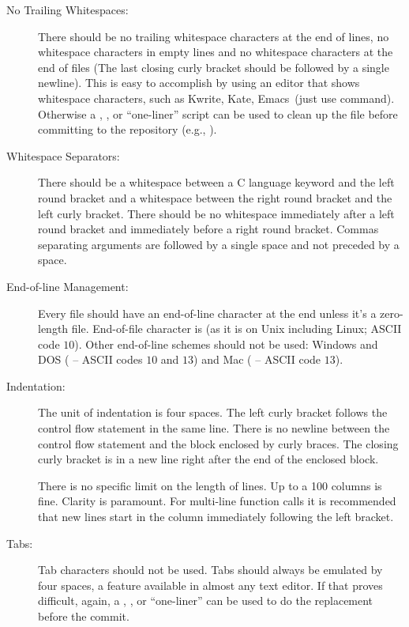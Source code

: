 \begin{description}
\item[No Trailing Whitespaces:]
There should be no trailing whitespace characters at the end of lines,
no whitespace characters in empty lines and no whitespace characters
at the end of files (The last closing curly bracket should be followed
by a single newline). This is easy to accomplish by using an editor that
shows whitespace characters, such as Kwrite, Kate, Emacs~(just use
 command). Otherwise a ,
, or  ``one-liner'' script can be used to clean up
the file before committing to the repository (e.g., ).

\item[Whitespace Separators:]
There should be a whitespace between a C language keyword and the left round
bracket and a whitespace between the right round bracket and the left curly
bracket. There should be no whitespace immediately after a left round bracket
and immediately before a right round bracket.
Commas separating arguments are followed by a single space and not preceded
by a space.

\item[End-of-line Management:]
Every file should have an end-of-line character at the end unless it's a
zero-length file. End-of-file character is  (as it
is on Unix including Linux; ASCII code $10$). Other end-of-line schemes should not be
used: Windows and DOS ( -- ASCII
codes $10$ and $13$) and Mac ( -- ASCII code
$13$).

\item[Indentation:]
The unit of indentation is four spaces. The left curly bracket follows the
control flow statement in the same line. There is no newline between the
control flow statement and the block enclosed by curly braces. The closing
curly bracket is in a new line right after the end of the enclosed block.

There is no specific limit on the length of lines. Up to a 100 columns is
fine. Clarity is paramount. For multi-line function calls it is recommended
that new lines start in the column immediately following the left bracket.

\item[Tabs:]
Tab characters should not be used. Tabs should always be emulated by four
spaces, a feature available in almost any text editor. If that proves
difficult, again, a , , or  ``one-liner'' can be used to do the replacement
before the commit.


\end{description}
